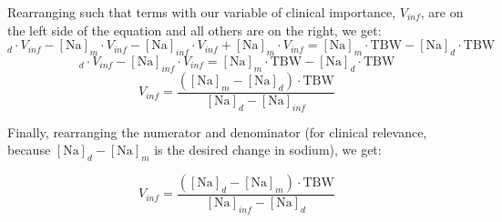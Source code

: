 \documentclass[12pt]{article}
\newcommand{\na}{\mathrm{Na}}
\newcommand{\tbw}{\mathrm{TBW}}
\begin{document}
	Rearranging such that terms with our variable of clinical importance, $V_{inf}$, are on the left side of the equation and all others are on the right, we get:
	\begin{equation}
		[\na]_d \cdot V_{inf} - [\na]_m \cdot V_{inf} - [\na]_{inf} \cdot V_{inf} + [\na]_m \cdot V_{inf} = [\na]_m \cdot \tbw - [\na]_d \cdot \tbw
	\end{equation}
	\begin{equation}
		[\na]_d \cdot V_{inf} - [\na]_{inf} \cdot V_{inf} = [\na]_m \cdot \tbw - [\na]_d \cdot \tbw
	\end{equation}
	\begin{equation}
		V_{inf} = \frac{([\na]_m - [\na]_d) \cdot \tbw}{[\na]_d - [\na]_{inf}}
	\end{equation}
	\begin{sloppypar}
	Finally, rearranging the numerator and denominator (for clinical relevance, because \mbox{$[\na]_d - [\na]_m$} is the desired change in sodium), we get:
	\end{sloppypar}
	\begin{equation}
		V_{inf} = \frac{([\na]_d - [\na]_m) \cdot \tbw}{[\na]_{inf} - [\na]_d}
	\end{equation}
\end{document}
